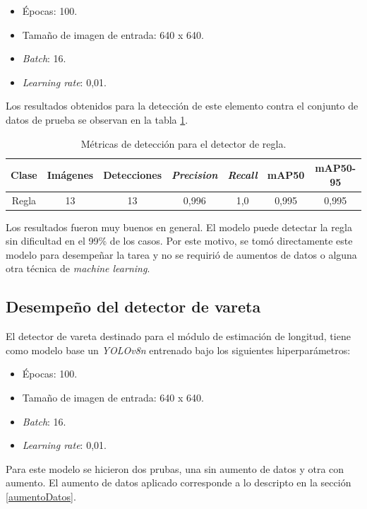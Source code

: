 \begin{itemize}
	\item Épocas: 100.
    \item Tamaño de imagen de entrada: 640 x 640.
    \item \textit{Batch}: 16.
    \item \textit{Learning rate}: 0,01.
\end{itemize}

Los resultados obtenidos para la detección de este elemento contra el conjunto de datos de prueba se observan en la tabla \ref{tab:resultadosRegla}.

\begin{table}[h]
	\centering
	\caption{Métricas de detección para el detector de regla.}
	\begin{tabular}{c c c c c c c}    
		\toprule
		\textbf{Clase}&\textbf{Imágenes}&\textbf{Detecciones}&\textbf{\textit{Precision}} &\textbf{\textit{Recall}}&\textbf{mAP50}&\textbf{mAP50-95}\\
		\midrule
		Regla & 13 & 13 & 0,996 & 1,0 & 0,995 & 0,995\\		
		\bottomrule
		\hline
	\end{tabular}
	\label{tab:resultadosRegla}
\end{table}

Los resultados fueron muy buenos en general. El modelo puede detectar la regla sin dificultad en el 99\% de los casos. Por este motivo, se tomó directamente este modelo para desempeñar la tarea y no se requirió de aumentos de datos o alguna otra técnica de \textit{machine learning}.

\subsection{Desempeño del detector de vareta}

El detector de vareta destinado para el módulo de estimación de longitud, tiene como modelo base un \textit{YOLOv8n} entrenado bajo los siguientes hiperparámetros:

\begin{itemize}
	\item Épocas: 100.
    \item Tamaño de imagen de entrada: 640 x 640.
    \item \textit{Batch}: 16.
    \item \textit{Learning rate}: 0,01.
\end{itemize}

Para este modelo se hicieron dos prubas, una sin aumento de datos y otra con aumento. El aumento de datos aplicado corresponde a lo descripto en la sección \ref{aumentoDatos}.

